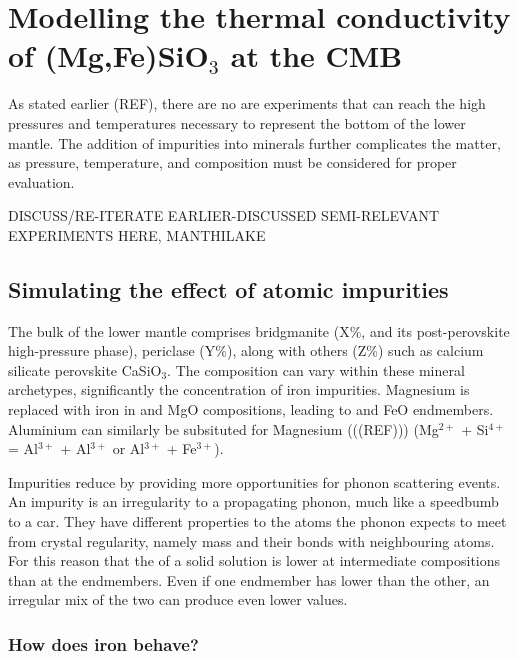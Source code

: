 \chapter{Modelling the thermal conductivity of (Mg,Fe)SiO$_3$ at the CMB} %

\label{Chapter4} %

As stated earlier (REF), there are no are experiments that can reach the high pressures and temperatures necessary to represent the bottom of the lower mantle. The addition of impurities into minerals further complicates the matter, as pressure, temperature, and composition must be considered for proper evaluation.

DISCUSS/RE-ITERATE EARLIER-DISCUSSED SEMI-RELEVANT EXPERIMENTS HERE, MANTHILAKE

\section{Simulating the effect of atomic impurities}

The bulk of the lower mantle comprises bridgmanite (X\%, and its post-perovskite high-pressure phase), periclase (Y\%), along with others (Z\%) such as calcium silicate perovskite CaSiO$_3$. The composition can vary within these mineral archetypes, significantly the concentration of iron impurities. Magnesium is replaced with iron in 
\mgsios and MgO compositions, leading to \fesios and FeO endmembers. Aluminium can similarly be subsituted for Magnesium (((REF))) (Mg$^{2+}$ + Si$^{4+}$ = Al$^{3+}$ + Al$^{3+}$ or Al$^{3+}$ + Fe$^{3+}$).

Impurities reduce \tcs by providing more opportunities for phonon scattering events. An impurity is an irregularity to a propagating phonon, much like a speedbumb to a car. They have different properties to the atoms the phonon expects to meet from crystal regularity, namely mass and their bonds with neighbouring atoms. For this reason that the \tcs of a solid solution is lower at intermediate compositions than at the endmembers. Even if one endmember has lower \cs than the other, an irregular mix of the two can produce even lower values.

\subsection{How does iron behave?} 

